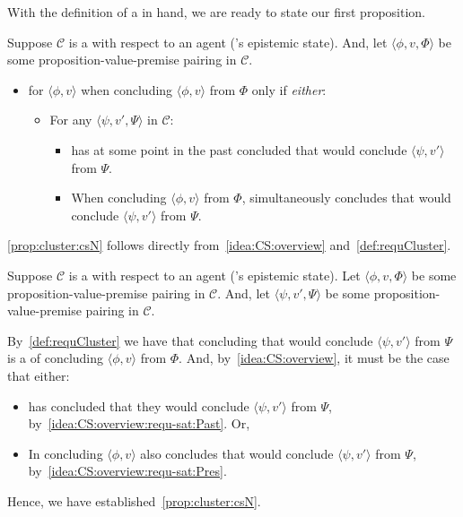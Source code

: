 \begin{note}
  With the definition of a \cluster{} in hand, we are ready to state our first proposition.

  \begin{proposition}
    \label{prop:cluster:csN}
    Suppose \(\mathcal{C}\) is a  with respect to an agent \vAgent{}('s epistemic state).
    And, let \(\langle \phi,v,\Phi \rangle\) be some proposition-value-premise pairing in \(\mathcal{C}\).

    \begin{itemize}
    \item
      \vAgent{} \csV{} for \(\langle \phi,v \rangle\) when concluding \(\langle \phi,v \rangle\) from \(\Phi\) only if \emph{either}:
      \begin{itemize}
      \item
        For any \(\langle \psi,v',\Psi \rangle\) in \(\mathcal{C}\):
        \begin{itemize}
        \item \vAgent{} has at some point in the past concluded that \vAgent{} would conclude \(\langle \psi,v' \rangle\) from \(\Psi\).
        \item
          When concluding \(\langle \phi,v \rangle\) from \(\Phi\), \vAgent{} simultaneously concludes that \vAgent{} would conclude \(\langle \psi,v' \rangle\) from \(\Psi\).
        \end{itemize}
      \end{itemize}
    \end{itemize}
  \end{proposition}

  \autoref{prop:cluster:csN} follows directly from~\autoref{idea:CS:overview} and~\autoref{def:requCluster}.

  \begin{argument}
    Suppose \(\mathcal{C}\) is a  with respect to an agent \vAgent{}('s epistemic state).
    Let \(\langle \phi,v,\Phi \rangle\) be some proposition-value-premise pairing in \(\mathcal{C}\).
    And, let \(\langle \psi,v',\Psi \rangle\) be some proposition-value-premise pairing in \(\mathcal{C}\).

    By~\autoref{def:requCluster} we have that \vAgent{} concluding that \vAgent{} would conclude \(\langle \psi,v' \rangle\) from \(\Psi\) is a \requ{} of concluding \(\langle \phi,v \rangle\) from \(\Phi\).
    And, by~\autoref{idea:CS:overview}, it must be the case that either:
    \begin{itemize}
    \item
      \vAgent{} has concluded that they would conclude \(\langle \psi, v' \rangle\) from \(\Psi\), by~\ref{idea:CS:overview:requ-sat:Past}.
      Or,
    \item
      In concluding \(\langle \phi,v \rangle\) \vAgent{} also concludes that \vAgent{} would conclude \(\langle \psi, v' \rangle\) from \(\Psi\), by~\ref{idea:CS:overview:requ-sat:Pres}.
    \end{itemize}
    Hence, we have established~\ref{prop:cluster:csN}.
  \end{argument}
\end{note}

